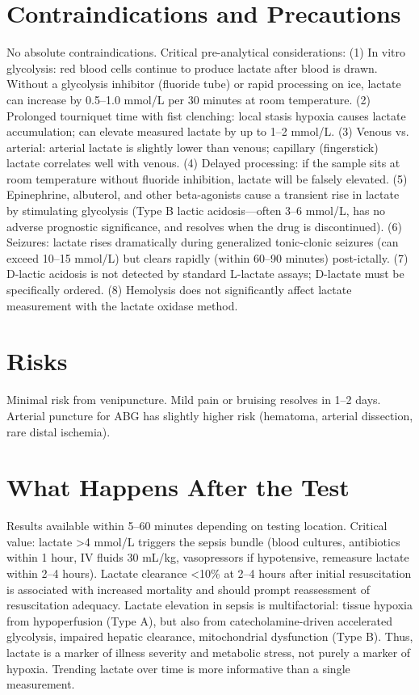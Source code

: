 \section*{Contraindications and Precautions}
No absolute contraindications. Critical pre-analytical considerations: (1) In vitro glycolysis: red blood cells continue to produce lactate after blood is drawn. Without a glycolysis inhibitor (fluoride tube) or rapid processing on ice, lactate can increase by 0.5--1.0 mmol/L per 30 minutes at room temperature. (2) Prolonged tourniquet time with fist clenching: local stasis hypoxia causes lactate accumulation; can elevate measured lactate by up to 1--2 mmol/L. (3) Venous vs. arterial: arterial lactate is slightly lower than venous; capillary (fingerstick) lactate correlates well with venous. (4) Delayed processing: if the sample sits at room temperature without fluoride inhibition, lactate will be falsely elevated. (5) Epinephrine, albuterol, and other beta-agonists cause a transient rise in lactate by stimulating glycolysis (Type B lactic acidosis---often 3--6 mmol/L, has no adverse prognostic significance, and resolves when the drug is discontinued). (6) Seizures: lactate rises dramatically during generalized tonic-clonic seizures (can exceed 10--15 mmol/L) but clears rapidly (within 60--90 minutes) post-ictally. (7) D-lactic acidosis is not detected by standard L-lactate assays; D-lactate must be specifically ordered. (8) Hemolysis does not significantly affect lactate measurement with the lactate oxidase method.

\section*{Risks}
Minimal risk from venipuncture. Mild pain or bruising resolves in 1--2 days. Arterial puncture for ABG has slightly higher risk (hematoma, arterial dissection, rare distal ischemia).

\section*{What Happens After the Test}
Results available within 5--60 minutes depending on testing location. Critical value: lactate >4 mmol/L triggers the sepsis bundle (blood cultures, antibiotics within 1 hour, IV fluids 30 mL/kg, vasopressors if hypotensive, remeasure lactate within 2--4 hours). Lactate clearance <10\% at 2--4 hours after initial resuscitation is associated with increased mortality and should prompt reassessment of resuscitation adequacy. Lactate elevation in sepsis is multifactorial: tissue hypoxia from hypoperfusion (Type A), but also from catecholamine-driven accelerated glycolysis, impaired hepatic clearance, mitochondrial dysfunction (Type B). Thus, lactate is a marker of illness severity and metabolic stress, not purely a marker of hypoxia. Trending lactate over time is more informative than a single measurement.

